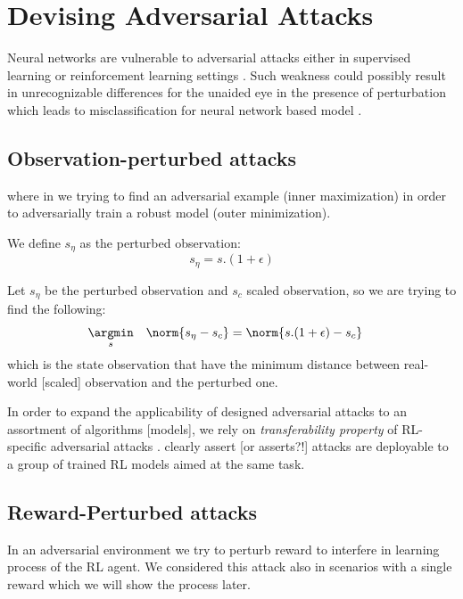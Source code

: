 \documentclass[letterpaper,12pt]{article}
\begin{document}
    \section{Devising Adversarial Attacks}
    Neural networks are vulnerable to adversarial attacks either in supervised learning or reinforcement learning settings \cite{Huang2017}. Such weakness could possibly result in unrecognizable differences for the unaided eye in the presence of perturbation which leads to misclassification for neural network based model \cite{Szegedy2014, Goodfellow2014}.


    \subsection{Observation-perturbed attacks}


    where in we trying to find an adversarial example (inner maximization) in order to adversarially train a robust model (outer minimization).

    We define $s_\eta$ as the perturbed observation:
    \begin{equation}
        s_\eta = s . (1 + \epsilon)
    \end{equation}


    Let $s_\eta$ be the perturbed observation and $s_c$ scaled observation, so we are trying to find the following:
    \begin{equation}
        \begin{aligned}
            & \underset{s}{\argmin}
            & & {\norm{s_\eta - s_c}} = \norm{s . (1 + \epsilon) - s_c}
        \end{aligned}
    \end{equation}
    which is the state observation that have the minimum distance between real-world [scaled] observation and the perturbed one.

    In order to expand the applicability of designed adversarial attacks to an assortment of algorithms [models], we rely on \textit{transferability property} of RL-specific adversarial attacks \cite{Szegedy2014, Papernot2016, Goodfellow2014a}. \cite{Huang2017} clearly assert [or asserts?!] attacks are deployable to a group of trained RL models aimed at the same task.

    \subsection{Reward-Perturbed attacks}
    In an adversarial environment we try to perturb reward to interfere in learning process of the RL agent. We considered this attack also in scenarios with a single reward which we will show the process later.
\end{document}
